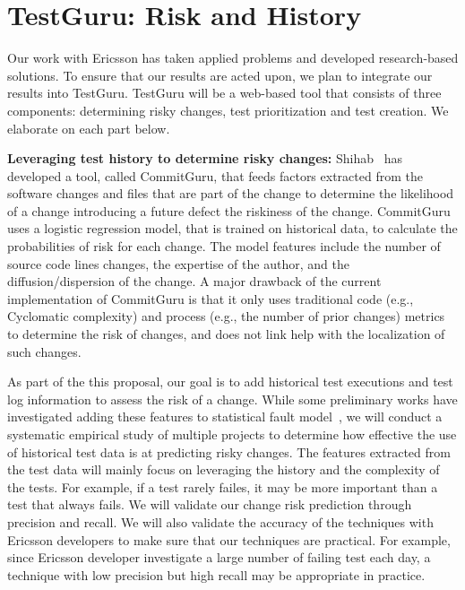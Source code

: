 \section{TestGuru: Risk and History}

Our work with Ericsson has taken applied problems and developed research-based solutions. To ensure that our results are acted upon, we plan to integrate our results into TestGuru. TestGuru will be a web-based tool that consists of three components: determining risky changes, test prioritization and test creation. We elaborate on each part below.

\textbf{Leveraging test history to determine risky changes:} Shihab~\cite{Rosen2015FSE} has developed a tool, called CommitGuru, that feeds factors extracted from the software changes and files that are part of the change to determine the likelihood of a change introducing a future defect \ie the riskiness of the change. CommitGuru uses a logistic regression model, that is trained on historical data, to calculate the probabilities of risk for each change. The model features include the number of source code lines changes, the expertise of the author, and the diffusion/dispersion of the change. A major drawback of the current implementation of CommitGuru is that it only uses traditional code (e.g., Cyclomatic complexity) and process (e.g., the number of prior changes) metrics to determine the risk of changes, and does not link help with the localization of such changes.

As part of the this proposal, our goal is to add historical test executions and test log information to assess the risk of a change. While some preliminary works have investigated adding these features to statistical fault model~\cite{Herzig2014ISSRE}, we will conduct a systematic empirical study of multiple projects to determine how effective the use of historical test data is at predicting risky changes. The features extracted from the test data will mainly focus on leveraging the history and the complexity of the tests. For example, if a test rarely failes, it may be more important than a test that always fails. We will validate our change risk prediction through precision and recall. We will also validate the accuracy of the techniques with Ericsson developers to make sure that our techniques are practical. For example, since Ericsson developer investigate a large number of failing test each day, a technique with low precision but high recall may be appropriate in practice.

